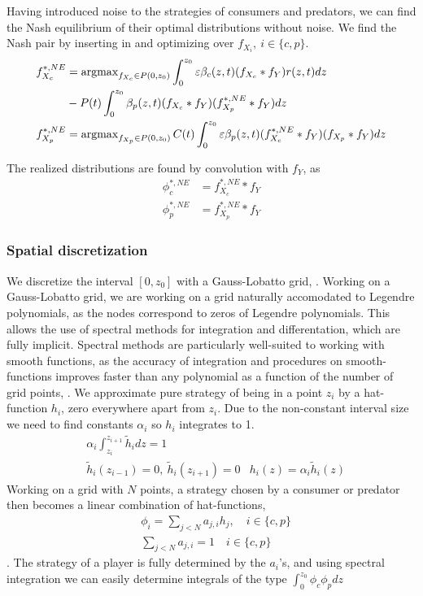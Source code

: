 Having introduced noise to the strategies of consumers and predators, we can find the Nash equilibrium of their optimal distributions without noise. We find the Nash pair by inserting  in  and optimizing over $f_{X_i},~i\in \{c, p\}$.
\begin{align}
	f_{X_c}^{*,NE} &=  \operatorname{argmax}_{f_{X_c} \in P(0,z_0)}  \int_0^{z_0} \varepsilon \beta_c(z,t)(f_{X_c} * f_Y) r(z,t) dz \\ & -  P(t)\int_0^{z_0} \beta_p(z,t) (f_{X_c} * f_Y)(f_{X_p}^{*,NE} * f_Y) dz \\
	f_{X_p}^{*,NE} &=  \operatorname{argmax}_{f_{X_p} \in P(0,z_0)}C(t) \int_0^{z_0} \varepsilon \beta_p(z,t)(f_{X_c}^{*,NE}  * f_Y)(f_{X_p}* f_Y) dz
\end{align}

The realized distributions are found by convolution with $f_Y$,  as
\begin{align}
  \phi_c^{*,NE} &= f_{X_c}^{*,NE} * f_Y \\
  \phi_p^{*,NE} &= f_{X_p}^{*,NE} * f_Y
\end{align}

\subsubsection*{Spatial discretization}
We discretize the interval $[0,z_0]$ with a Gauss-Lobatto grid, \citep{kopriva2009implementing}. Working on a Gauss-Lobatto grid, we are working on a grid naturally accomodated to Legendre polynomials, as the nodes correspond to zeros of Legendre polynomials. This allows the use of spectral methods for integration and differentation, which are fully implicit. Spectral methods are particularly well-suited to working with smooth functions, as the accuracy of integration and procedures on smooth-functions improves faster than any polynomial as a function of the number of grid points, \citep{kopriva2009implementing}.
We approximate pure strategy of being in a point $z_i$  by a hat-function $h_i$, zero everywhere apart from $z_i$. Due to the non-constant interval size we need to find constants $\alpha_i$ so $h_i$ integrates to 1.
\begin{align}
	&\alpha_i \int_{z_i}^{z_{i+1}} \tilde{h}_i dz = 1 \\
	&\tilde{h}_i(z_{i-1}) = 0,~ \tilde{h}_i(z_{i+1}) = 0
  &h_i(z)=\alpha_i \tilde{h}_i(z)
\end{align}
Working on a grid with $N$ points, a strategy chosen by a consumer or predator then becomes a linear combination of hat-functions,
\begin{align}
  &\phi_{i} = \sum_{j<N} a_{j,i} h_j, \quad i\in \{c,p\} \\
  &\sum_{j<N} a_{j,i} = 1 \quad i\in \{c,p\}
\end{align}
. The strategy of a player is fully determined by the $a_i$'s, and using spectral integration we can easily determine integrals of the type $\int_0^{z_0} \phi_c \phi_p dz$


